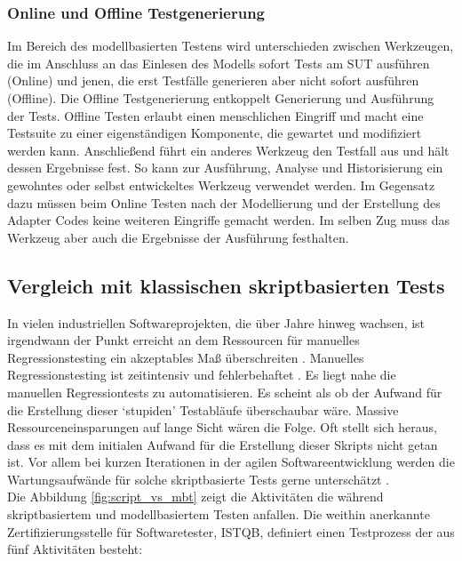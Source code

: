 \subsubsection{Online und Offline Testgenerierung}
\label{sec:online_offline}
Im Bereich des modellbasierten Testens wird unterschieden zwischen Werkzeugen, die im Anschluss an das Einlesen des Modells sofort Tests am \gls{SUT} ausführen (Online) und jenen, die erst Testfälle generieren aber nicht sofort ausführen (Offline). Die Offline Testgenerierung entkoppelt Generierung und Ausführung der Tests. Offline Testen erlaubt einen menschlichen Eingriff und macht eine Testsuite zu einer eigenständigen Komponente, die gewartet und modifiziert werden kann. Anschließend führt ein anderes Werkzeug den Testfall aus und hält dessen Ergebnisse fest. So kann zur Ausführung, Analyse und Historisierung ein gewohntes oder selbst entwickeltes Werkzeug verwendet werden. Im Gegensatz dazu müssen beim Online Testen nach der Modellierung und der Erstellung des Adapter Codes keine weiteren Eingriffe gemacht werden. Im selben Zug muss das Werkzeug aber auch die Ergebnisse der Ausführung festhalten.


\subsection{Vergleich mit klassischen skriptbasierten Tests}
In vielen industriellen Softwareprojekten, die über Jahre hinweg wachsen, ist irgendwann der Punkt erreicht an dem Ressourcen für manuelles Regressionstesting ein akzeptables Maß überschreiten \cite{graham_experiences_2012}. Manuelles Regressionstesting ist zeitintensiv und fehlerbehaftet \cite{utting_practical_2007}. Es liegt nahe die manuellen Regressiontests zu automatisieren. Es scheint als ob der Aufwand für die Erstellung dieser `stupiden' Testabläufe überschaubar wäre. Massive Ressourceneinsparungen auf lange Sicht wären die Folge. Oft stellt sich heraus, dass es mit dem initialen Aufwand für die Erstellung dieser Skripts nicht getan ist. Vor allem bei kurzen Iterationen in der agilen Softwareentwicklung werden die Wartungsaufwände für solche skriptbasierte Tests gerne unterschätzt \cite{graham_experiences_2012}.\\
Die Abbildung \ref{fig:script_vs_mbt} zeigt die Aktivitäten die während skriptbasiertem und modellbasiertem Testen anfallen. Die weithin anerkannte Zertifizierungsstelle für Softwaretester, \Gls{ISTQB}, definiert einen Testprozess \cite{spillner_basiswissen_2012} der aus fünf Aktivitäten besteht:

